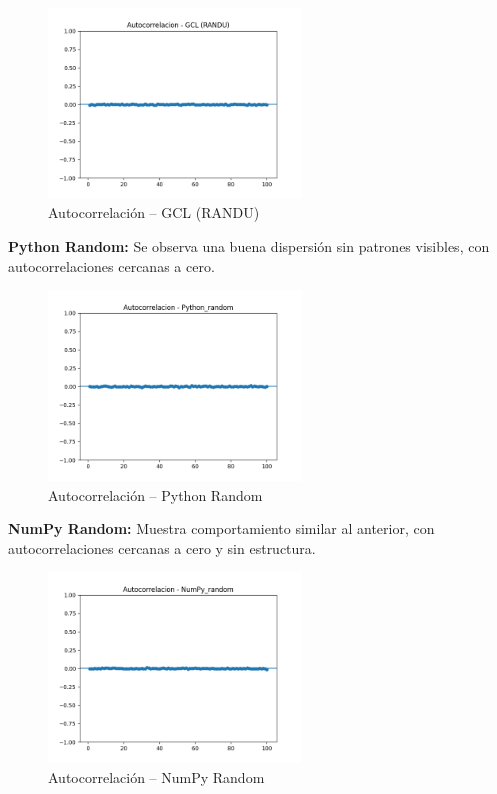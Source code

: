 \documentclass{article}
\begin{document}
\begin{figure}[H]
\centering
\includegraphics[width=0.6\textwidth]{Imagenes/autocorrelacion_GCL (RANDU).png}
\caption{Autocorrelación – GCL (RANDU)}
\end{figure}

\textbf{Python Random:} Se observa una buena dispersión sin patrones visibles, con autocorrelaciones cercanas a cero.

\begin{figure}[H]
\centering
\includegraphics[width=0.6\textwidth]{Imagenes/autocorrelacion_Python_random.png}
\caption{Autocorrelación – Python Random}
\end{figure}

\textbf{NumPy Random:} Muestra comportamiento similar al anterior, con autocorrelaciones cercanas a cero y sin estructura.

\begin{figure}[H]
\centering
\includegraphics[width=0.6\textwidth]{Imagenes/autocorrelacion_NumPy_random.png}
\caption{Autocorrelación – NumPy Random}
\end{figure}
\end{document}
